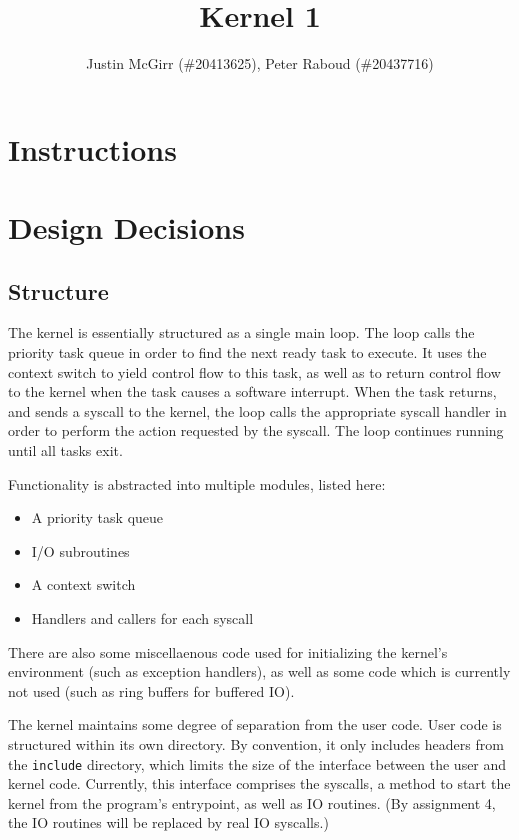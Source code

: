 \documentclass[titlepage]{article}
\begin{document}
\title{Kernel 1}
\author{Justin McGirr (\#20413625), Peter Raboud (\#20437716)}
\maketitle

\section{Instructions}

\section{Design Decisions}
\subsection{Structure}
The kernel is essentially structured as a single main loop.
The loop calls the priority task queue in order to find the next ready task
to execute.
It uses the context switch to yield control flow to this task, as well as to
return control flow to the kernel when the task causes a software interrupt.
When the task returns, and sends a syscall to the kernel, the loop calls
the appropriate syscall handler in order to perform the action requested by
the syscall.
The loop continues running until all tasks exit.

Functionality is abstracted into multiple modules, listed here:

\begin{itemize}
\item A priority task queue
\item I/O subroutines
\item A context switch
\item Handlers and callers for each syscall
\end{itemize}

There are also some miscellaenous code used for initializing the kernel's environment
(such as exception handlers), as well as some code which is currently not used (such
as ring buffers for buffered IO).

The kernel maintains some degree of separation from the user code.
User code is structured within its own directory.
By convention, it only includes headers from the \texttt{include} directory,
which limits the size of the interface between the user and kernel code.
Currently, this interface comprises the syscalls, a method to start the kernel from
the program's entrypoint, as well as IO routines.
(By assignment 4, the IO routines will be replaced by real IO syscalls.)
\end{document}
